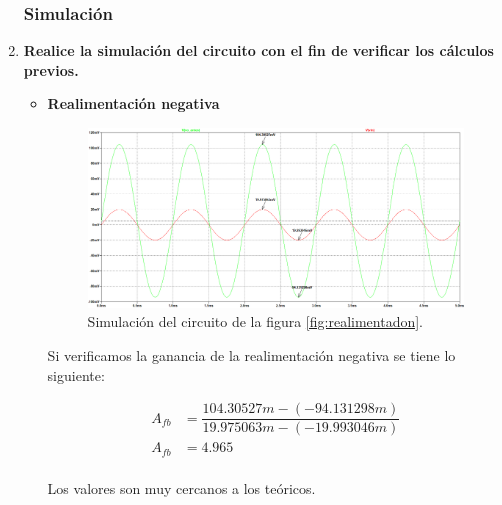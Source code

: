 \begin{enumerate}
        \subsubsection{Simulación}

  \item \textbf{Realice la simulación del circuito con el fin de verificar los cálculos previos.}
        \begin{itemize}
          \item \textbf{Realimentación negativa}



                \begin{figure}[H]
                  \centering
                  \includegraphics[width=\textwidth]{Imagenes/sim_vovi_realimentadon.png}
                  \caption{Simulación del circuito de la figura \ref{fig:realimentadon}.}
                  \label{fig:sim_vovi_retroalimentadon}
                \end{figure}

                Si verificamos la ganancia de la realimentación negativa se tiene lo siguiente:

                \begin{align*}
                  A_{fb} & = \dfrac{104.30527m-(-94.131298m)}{19.975063m-(-19.993046m)} \\[0.2cm]
                  A_{fb} & = 4.965                                                      \\[0.2cm]
                \end{align*}

                Los valores son muy cercanos a los teóricos.


\end{itemize}
\end{enumerate}
